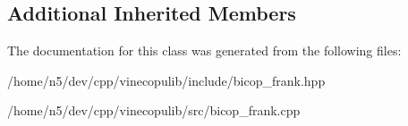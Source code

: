 \subsection*{Additional Inherited Members}


The documentation for this class was generated from the following files\+:\begin{DoxyCompactItemize}
\item 
/home/n5/dev/cpp/vinecopulib/include/bicop\+\_\+frank.\+hpp\item 
/home/n5/dev/cpp/vinecopulib/src/bicop\+\_\+frank.\+cpp\end{DoxyCompactItemize}
